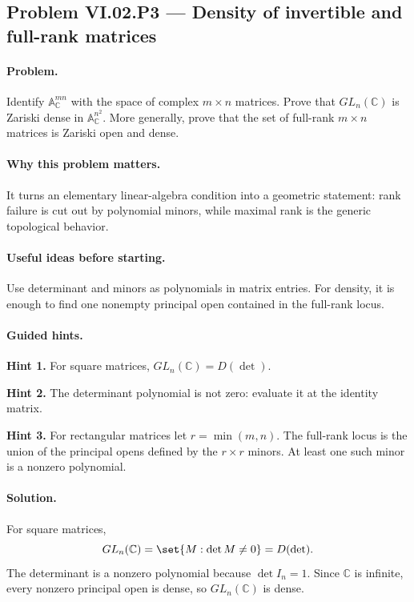 \subsection*{Problem VI.02.P3 --- Density of invertible and full-rank matrices}
\label{prob:vi02-p3}

\paragraph{Problem.}
Identify \(\mathbb A_{\mathbb C}^{mn}\) with the space of complex \(m\times n\) matrices.
Prove that \(GL_n(\mathbb C)\) is Zariski dense in \(\mathbb A_{\mathbb C}^{n^2}\).  More
generally, prove that the set of full-rank \(m\times n\) matrices is Zariski open and dense.

\ifdefined\FullProblemDossiers
\paragraph{Why this problem matters.}
It turns an elementary linear-algebra condition into a geometric statement: rank failure is
cut out by polynomial minors, while maximal rank is the generic topological behavior.

\paragraph{Useful ideas before starting.}
Use determinant and minors as polynomials in matrix entries.  For density, it is enough to
find one nonempty principal open contained in the full-rank locus.

\paragraph{Guided hints.}
\textbf{Hint 1.} For square matrices, \(GL_n(\mathbb C)=D(\det)\).

\textbf{Hint 2.} The determinant polynomial is not zero: evaluate it at the identity matrix.

\textbf{Hint 3.} For rectangular matrices let \(r=\min(m,n)\).  The full-rank locus is the
union of the principal opens defined by the \(r\times r\) minors.  At least one such minor
is a nonzero polynomial.

\paragraph{Solution.}
For square matrices,
\[
GL_n(\mathbb C)=\set{M:\det M\neq0}=D(\det).
\]
The determinant is a nonzero polynomial because \(\det I_n=1\).  Since \(\mathbb C\) is
infinite, every nonzero principal open is dense, so \(GL_n(\mathbb C)\) is dense.

